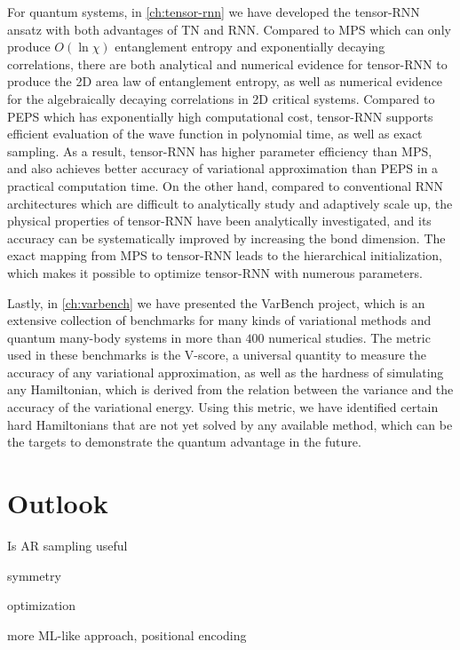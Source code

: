 For quantum systems, in \cref{ch:tensor-rnn} we have developed the tensor-RNN ansatz with both advantages of TN and RNN. Compared to MPS which can only produce $O(\ln \chi)$ entanglement entropy and exponentially decaying correlations, there are both analytical and numerical evidence for tensor-RNN to produce the 2D area law of entanglement entropy, as well as numerical evidence for the algebraically decaying correlations in 2D critical systems. Compared to PEPS which has exponentially high computational cost, tensor-RNN supports efficient evaluation of the wave function in polynomial time, as well as exact sampling. As a result, tensor-RNN has higher parameter efficiency than MPS, and also achieves better accuracy of variational approximation than PEPS in a practical computation time. On the other hand, compared to conventional RNN architectures which are difficult to analytically study and adaptively scale up, the physical properties of tensor-RNN have been analytically investigated, and its accuracy can be systematically improved by increasing the bond dimension. The exact mapping from MPS to tensor-RNN leads to the hierarchical initialization, which makes it possible to optimize tensor-RNN with numerous parameters.

Lastly, in \cref{ch:varbench} we have presented the VarBench project, which is an extensive collection of benchmarks for many kinds of variational methods and quantum many-body systems in more than $400$ numerical studies. The metric used in these benchmarks is the V-score, a universal quantity to measure the accuracy of any variational approximation, as well as the hardness of simulating any Hamiltonian, which is derived from the relation between the variance and the accuracy of the variational energy. Using this metric, we have identified certain hard Hamiltonians that are not yet solved by any available method, which can be the targets to demonstrate the quantum advantage in the future.

\section{Outlook}

Is AR sampling useful

symmetry

optimization

more ML-like approach, positional encoding
